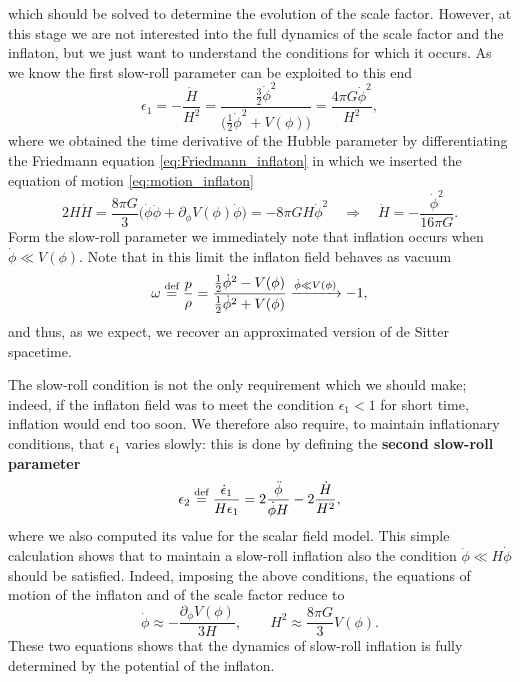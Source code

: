which should be solved to determine the evolution of the scale factor. However, at this stage we are not interested into the full dynamics of the scale factor and the inflaton, but we just want to understand the conditions for which it occurs. As we know the first slow-roll parameter can be exploited to this end
\begin{equation}
    \epsilon_1=-\frac{\dot H}{H^2}=\frac{\frac{3}{2}\dot\phi^2}{\big(\frac{1}{2}\dot\phi^2+V(\phi)\big)}=\frac{4\pi G\dot\phi^2}{H^2},\label{eq:SRP_field}
\end{equation}
where we obtained the time derivative of the Hubble parameter by differentiating the Friedmann equation \eqref{eq:Friedmann_inflaton} in which we inserted the equation of motion \eqref{eq:motion_inflaton}
$$2H\dot H=\frac{8\pi G}{3}\bigg(\dot\phi\ddot\phi+\partial_\phi V(\phi)\dot\phi\bigg)=-8\pi GH\dot \phi^2\quad\Rightarrow\quad \boxed{\dot H=-\frac{\dot \phi^2}{16\pi G}}.$$
Form the slow-roll parameter we immediately note that inflation occurs when $\dot \phi\ll V(\phi)$. Note that in this limit the inflaton field behaves as vacuum $$\omega\stackrel{\text{def}}{=}\frac{p}{\rho}=\frac{\frac{1}{2}\dot\phi^2-V(\phi)}{\frac{1}{2}\dot\phi^2+V(\phi)}\xrightarrow{\dot\phi\ll V(\phi)}-1,$$
and thus, as we expect, we recover an approximated version of de Sitter spacetime.

The slow-roll condition is not the only requirement which we should make; indeed, if the inflaton field was to meet the condition $\epsilon_1<1$ for short time, inflation would end too soon. We therefore also require, to maintain inflationary conditions, that $\epsilon_1$ varies slowly: this is done by defining the \textbf{second slow-roll parameter}
\begin{equation}
    \epsilon_2\stackrel{\text{def}}{=}\frac{\dot\epsilon_1}{H\epsilon_1}=2\frac{\ddot\phi}{\dot\phi H}-2\frac{\dot H}{H^2},\label{eq:second_sr_parameter}
\end{equation}
where we also computed its value for the scalar field model. This simple calculation shows that to maintain a slow-roll inflation also the condition $\ddot\phi\ll H\dot\phi$ should be satisfied. Indeed, imposing the above conditions, the equations of motion of the inflaton and of the scale factor reduce to
\begin{equation}
    \label{eq:SR_equation_motion}
    \dot\phi \approx-\frac{\partial_\phi V(\phi)}{3H},\qquad H^2\approx\frac{8\pi G}{3}V(\phi).
\end{equation}
These two equations shows that the dynamics of slow-roll inflation is fully determined by the potential of the inflaton. 
